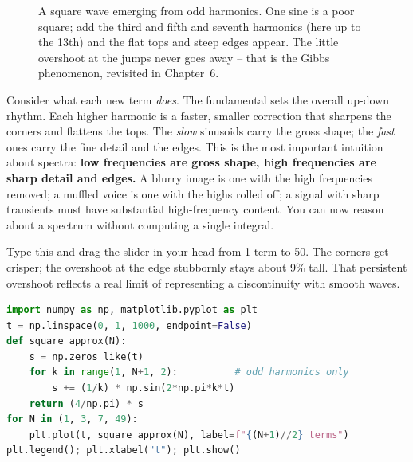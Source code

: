 \begin{figure}[H]
\centering
{}
\caption{A square wave emerging from odd harmonics. One sine is a poor square; add
the third and fifth and seventh harmonics (here up to the 13th) and the flat tops
and steep edges appear. The little overshoot at the jumps never goes away -- that is
the Gibbs phenomenon, revisited in Chapter~6.}
\label{ch05:square}
\end{figure}

\begin{happeningbox}
Consider what each new term \emph{does}. The fundamental sets the overall up-down
rhythm. Each higher harmonic is a faster, smaller correction that sharpens the
corners and flattens the tops. The \emph{slow} sinusoids carry the gross shape; the
\emph{fast} ones carry the fine detail and the edges. This is the most important
intuition about spectra: \textbf{low frequencies are gross shape, high frequencies
are sharp detail and edges.} A blurry image is one with the high frequencies removed;
a muffled voice is one with the highs rolled off; a signal with sharp transients
must have substantial high-frequency content. You can now reason about a spectrum
without computing a single integral.
\end{happeningbox}

\begin{labbox}
Type this and drag the slider in your head from 1 term to 50. The corners get
crisper; the overshoot at the edge stubbornly stays about 9\% tall. That persistent
overshoot reflects a real limit of representing a discontinuity
with smooth waves.
\begin{lstlisting}[language=Python]
import numpy as np, matplotlib.pyplot as plt
t = np.linspace(0, 1, 1000, endpoint=False)
def square_approx(N):
    s = np.zeros_like(t)
    for k in range(1, N+1, 2):          # odd harmonics only
        s += (1/k) * np.sin(2*np.pi*k*t)
    return (4/np.pi) * s
for N in (1, 3, 7, 49):
    plt.plot(t, square_approx(N), label=f"{(N+1)//2} terms")
plt.legend(); plt.xlabel("t"); plt.show()
\end{lstlisting}
\end{labbox}

